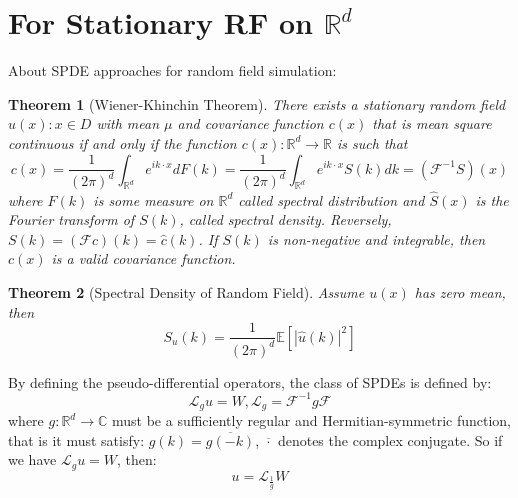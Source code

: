 \documentclass{article}
\newtheorem{theorem}{Theorem}
\begin{document}
\section{For Stationary RF on $\mathbb{R}^d$}
About SPDE approaches for random field simulation:
\begin{theorem}[Wiener-Khinchin Theorem]
    There exists a stationary random field ${u(x): x\in D}$ with mean $\mu$ and covariance function $c(x)$ that is mean square continuous if and only if 
    the function $c(x): \mathbb{R}^d\rightarrow \mathbb{R}$ is such that 
    \begin{equation}
        c(x) = \frac{1}{(2\pi)^{d}}\int_{\mathbb{R}^d} e^{ik \cdot x}dF(k)=\frac{1}{(2\pi)^{d}}\int_{\mathbb{R}^d} e^{ik \cdot x}S(k)dk = \left(\mathcal{F}^{-1}S\right)(x)
    \end{equation}
    where $F(k)$ is some measure on $\mathbb{R}^d$ called spectral distribution and $\hat{S}(x)$ is the Fourier transform of $S(k)$, 
	called spectral density.
    Reversely, $S(k) = \left(\mathcal{F}c\right)(k) = \hat{c}(k)$.
    If $S(k)$ is non-negative and integrable, then $c(x)$ is a valid covariance function.
\end{theorem}

\begin{theorem}[Spectral Density of Random Field]\label{spectral_density_random_field}
	Assume $u(x)$ has zero mean, then 
\begin{equation}\label{spectraldensity}
	S_u(k)=\frac{1}{(2\pi)^{d}}\mathbb{E}[|\hat{u}(k)|^2]
\end{equation}
\end{theorem}




By defining the pseudo-differential operators, the class of SPDEs is defined by:
\begin{equation}
	\mathcal{L}_gu = W, \mathcal{L}_g = \mathcal{F}^{-1}g\mathcal{F}
\end{equation}
where $g:\mathbb{R}^d\rightarrow \mathbb{C}$ must be a sufficiently regular and Hermitian-symmetric function, that is it must satisfy: $g(k) = \overline{g(-k)}$, $\overline{\cdot}$ denotes the complex conjugate.
So if we have $\mathcal{L}_gu = W$, then:
\begin{equation}
	u=\mathcal{L}_{\frac{1}{g}}W
\end{equation}
\end{document}
